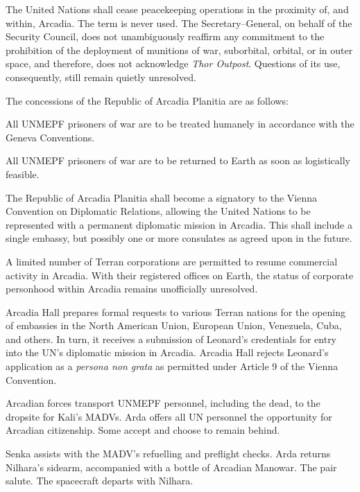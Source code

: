 \item The United Nations shall cease peacekeeping operations in the proximity of, and within, Arcadia. The term  is never used. The Secretary--General, on behalf of the Security Council, does not unambiguously reaffirm any commitment to the prohibition of the deployment of munitions of war, suborbital, orbital, or in outer space, and therefore, does not acknowledge {\it Thor Outpost}. Questions of its use, consequently, still remain quietly unresolved.
\stopitemize

The concessions of the Republic of Arcadia Planitia are as follows:

\startitemize[R]
\item All UNMEPF prisoners of war are to be treated humanely in accordance with the Geneva Conventions.

\item All UNMEPF prisoners of war are to be returned to Earth as soon as logistically feasible.

\item The Republic of Arcadia Planitia shall become a signatory to the Vienna Convention on Diplomatic Relations, allowing the United Nations to be represented with a permanent diplomatic mission in Arcadia. This shall include a single embassy, but possibly one or more consulates as agreed upon in the future.

\item A limited number of Terran corporations are permitted to resume commercial activity in Arcadia. With their registered offices on Earth, the status of corporate personhood within Arcadia remains unofficially unresolved.
\stopitemize

Arcadia Hall prepares formal requests to various Terran nations for the opening of embassies in the North American Union, European Union, Venezuela, Cuba, and others. In turn, it receives a submission of Leonard's credentials for entry into the UN's diplomatic mission in Arcadia. Arcadia Hall rejects Leonard's application as a {\it persona non grata} as permitted under Article 9 of the Vienna Convention.
\StopTimelineDate

Arcadian forces transport UNMEPF personnel, including the dead, to the dropsite for Kali's MADVs. Arda offers all UN personnel the opportunity for Arcadian citizenship. Some accept and choose to remain behind. 

Senka assists with the MADV's refuelling and preflight checks. Arda returns Nilhara's sidearm, accompanied with a bottle of Arcadian Manowar. The pair salute. The spacecraft departs with Nilhara.
\StopTimelineDate

